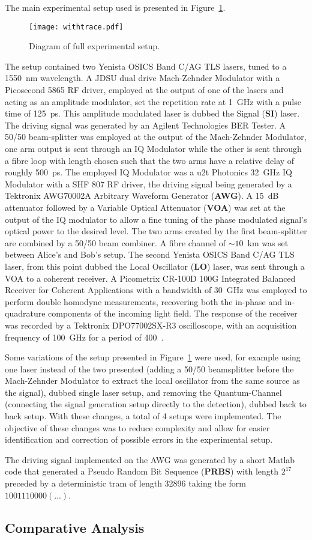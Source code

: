 The main experimental setup used is presented in Figure~\ref{fig:expDia}.
\begin{figure}[H]
\centering
\texttt{[image: withtrace.pdf]}
\caption{Diagram of full experimental setup.}
\label{fig:expDia}
\end{figure}
The setup contained two Yenista OSICS Band C/AG TLS lasers, tuned to a 1550~nm wavelength. A JDSU dual drive Mach-Zehnder Modulator with a Picosecond 5865 RF driver, employed at the output of one of the lasers and acting as an amplitude modulator, set the repetition rate at 1~GHz with a pulse time of 125~ps. This amplitude modulated laser is dubbed the Signal (\textbf{SI}) laser. The driving signal was generated by an Agilent Technologies BER Tester. A 50/50 beam-splitter was employed at the output of the Mach-Zehnder Modulator, one arm output is sent through an IQ Modulator while the other is sent through a fibre loop with length chosen such that the two arms have a relative delay of roughly 500~ps. The employed IQ Modulator was a u2t Photonics 32~GHz IQ Modulator with a SHF 807 RF driver, the driving signal being generated by a Tektronix AWG70002A Arbitrary Waveform Generator (\textbf{AWG}). A 15~dB attenuator followed by a Variable Optical Attenuator (\textbf{VOA}) was set at the output of the IQ modulator to allow a fine tuning of the phase modulated signal's optical power to the desired level. The two arms created by the first beam-splitter are combined by a 50/50 beam combiner. A fibre channel of $\sim10$~km was set between Alice's and Bob's setup. The second Yenista OSICS Band C/AG TLS laser, from this point dubbed the Local Oscillator (\textbf{LO}) laser, was sent through a VOA to a coherent receiver. A Picometrix CR-100D 100G Integrated Balanced Receiver for Coherent Applications with a bandwidth of  30~GHz was employed to perform double homodyne measurements, recovering both the in-phase and in-quadrature components of the incoming light field. The response of the receiver was recorded by a Tektronix DPO77002SX-R3 oscilloscope, with an acquisition frequency of 100~GHz for a period of 400~.
\par
Some variations of the setup presented in Figure~\ref{fig:expDia} were used, for example using one laser instead of the two presented (adding a 50/50 beamsplitter before the Mach-Zehnder Modulator to extract the local oscillator from the same source as the signal), dubbed single laser setup, and removing the Quantum-Channel (connecting the signal generation setup directly to the detection), dubbed back to back setup. With these changes, a total of 4 setups were implemented. The objective of these changes was to reduce complexity and allow for easier identification and correction of possible errors in the experimental setup.
\par
The driving signal implemented on the AWG was generated by a short Matlab code that generated a Pseudo Random Bit Sequence (\textbf{PRBS}) with length $2^{17}$ preceded by a deterministic tram of length 32896 taking the form $1001110000(...)$.

\subsection{Comparative Analysis}


 

